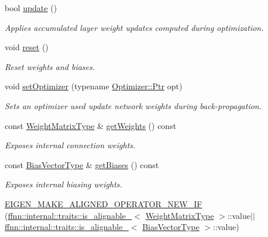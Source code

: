 \begin{DoxyCompactItemize}
bool \hyperlink{classffnn_1_1layer_1_1_fully_connected_a7dd4dbe010c3d290c131b21b35f6301e}{update} ()
\begin{DoxyCompactList}\small\item\em Applies accumulated layer weight updates computed during optimization. \end{DoxyCompactList}\item 
void \hyperlink{classffnn_1_1layer_1_1_fully_connected_aaeb55e214173a632b297d3ddac76fc24}{reset} ()
\begin{DoxyCompactList}\small\item\em Reset weights and biases. \end{DoxyCompactList}\item 
void \hyperlink{classffnn_1_1layer_1_1_fully_connected_ae57e6eedc1808825635a1c04aa018992}{set\-Optimizer} (typename \hyperlink{classffnn_1_1optimizer_1_1_optimizer_ac03e7181934bf0c12a97fc67a60484ab}{Optimizer\-::\-Ptr} opt)
\begin{DoxyCompactList}\small\item\em Sets an optimizer used update network weights during back-\/propagation. \end{DoxyCompactList}\item 
const \hyperlink{classffnn_1_1layer_1_1_fully_connected_aef17d91a349bf83f5e5a20462ebb3c81}{Weight\-Matrix\-Type} \& \hyperlink{classffnn_1_1layer_1_1_fully_connected_a96e00e6f6fec19f22a8830e5342bc7ef}{get\-Weights} () const 
\begin{DoxyCompactList}\small\item\em Exposes internal connection weights. \end{DoxyCompactList}\item 
const \hyperlink{classffnn_1_1layer_1_1_fully_connected_afd08719c4360bd1447d1108396b07e57}{Bias\-Vector\-Type} \& \hyperlink{classffnn_1_1layer_1_1_fully_connected_af7492d5d678fd45466d7768ab187a41e}{get\-Biases} () const 
\begin{DoxyCompactList}\small\item\em Exposes internal biasing weights. \end{DoxyCompactList}\item 
\hyperlink{classffnn_1_1layer_1_1_fully_connected_af771581b96123f77fffd9d344c700dc4}{E\-I\-G\-E\-N\-\_\-\-M\-A\-K\-E\-\_\-\-A\-L\-I\-G\-N\-E\-D\-\_\-\-O\-P\-E\-R\-A\-T\-O\-R\-\_\-\-N\-E\-W\-\_\-\-I\-F} (\hyperlink{structffnn_1_1internal_1_1traits_1_1is__alignable__128}{ffnn\-::internal\-::traits\-::is\-\_\-alignable\-\_}$<$ \hyperlink{classffnn_1_1layer_1_1_fully_connected_aef17d91a349bf83f5e5a20462ebb3c81}{Weight\-Matrix\-Type} $>$\-::value$\vert$$\vert$\hyperlink{structffnn_1_1internal_1_1traits_1_1is__alignable__128}{ffnn\-::internal\-::traits\-::is\-\_\-alignable\-\_}$<$ \hyperlink{classffnn_1_1layer_1_1_fully_connected_afd08719c4360bd1447d1108396b07e57}{Bias\-Vector\-Type} $>$\-::value)
\end{DoxyCompactItemize}
